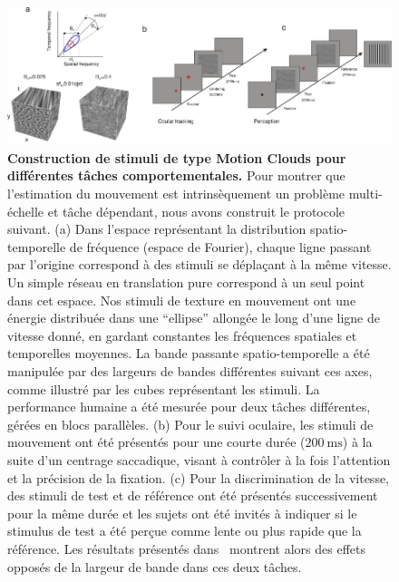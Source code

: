 \documentclass[11pt,french,a4paper,oneside]{article}%
\newcommand{\ms}{\si{\milli\second}}%
\begin{document}
\begin{figure}%
\centerline{\includegraphics[width=\linewidth]{Simoncini12fig1.png}}
\caption{\textbf{Construction de stimuli de type Motion Clouds pour différentes tâches comportementales.} Pour montrer que l'estimation du mouvement est intrinsèquement un problème multi-échelle et tâche dépendant, nous avons construit le protocole suivant. (a) Dans l'espace représentant la distribution spatio-temporelle de fréquence (espace de Fourier), chaque ligne passant par l'origine correspond à des stimuli se déplaçant à la même vitesse. Un simple réseau en translation pure correspond à un seul point dans cet espace. Nos stimuli de texture en mouvement ont une énergie distribuée dans une ``ellipse''  allongée le long d'une ligne de vitesse donné, en gardant constantes les fréquences spatiales et temporelles moyennes. La bande passante spatio-temporelle a été manipulée par des largeurs de bandes différentes suivant ces axes, comme illustré par les cubes représentant les stimuli. La performance humaine a été mesurée pour deux tâches différentes, gérées en blocs parallèles. (b) Pour le suivi oculaire, les stimuli de mouvement ont été présentés pour une courte durée ($200~\ms$) à la suite d'un centrage saccadique, visant à contrôler à la fois l'attention et la précision de la fixation. (c) Pour la discrimination de la vitesse, des stimuli de test et de référence ont été présentés successivement pour la même durée et les sujets ont été invités à indiquer si le stimulus de test a été perçue comme lente ou plus rapide que la référence. Les résultats présentés dans~\citep{Simoncini12} montrent alors des effets opposés de la largeur de bande dans ces deux tâches. %
 }%
\label{fig:simoncini12}%
\end{figure}%
\end{document}

